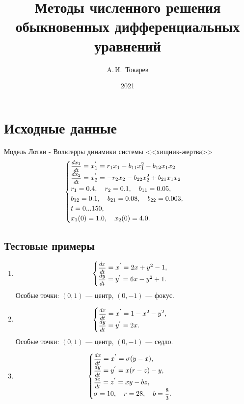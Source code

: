\documentclass[12pt, a4paper]{article}
\title{Методы численного решения обыкновенных дифференциальных уравнений}
\author{A.\,И.~Токарев}
\date{2021}
\begin{document}
\maketitle
\tableofcontents 
\newpage

\section{Исходные данные}
Модель Лотки - Вольтерры динамики системы <<хищник-жертва>>
\begin{equation*}
\begin{cases}
\hbox{\footnotesize$\displaystyle\frac{dx_1}{dt}$}= x_1^{'} =r_1x_1 - b_{11}x_1^2-b_{12}x_1x_2\\
\hbox{\footnotesize$\displaystyle\frac{dx_2}{dt}$}= x_2^{'} =-r_2x_2-b_{22}x_2^2+b_{21}x_1x_2\\
r_1 = 0{.}4, \quad r_2 = 0{.}1, \quad b_{11} = 0{.}05,\\
b_{12} = 0{.}1,\quad b_{21} = 0{.}08,\quad b_{22} = 0{.}003,\\
t = 0...150,\\
x_1(0) = 1{.}0,\quad x_2(0) = 4{.}0.
\end{cases}
\end{equation*}

\subsection{Тестовые примеры}
\begin{enumerate}
	\item\begin{equation*}
	\begin{cases}
	\hbox{\footnotesize$\displaystyle\frac{dx}{dt}$}= x^{'} =2x + y^2 - 1,\\
	\hbox{\footnotesize$\displaystyle\frac{dy}{dt}$}= y^{'} =6x - y^2 + 1.\\
	\end{cases}
	\end{equation*}
	Особые точки: $(0, 1)$ --- центр, $(0, -1)$ --- фокус.
	\item\begin{equation*}
	\begin{cases}
	\hbox{\footnotesize$\displaystyle\frac{dx}{dt}$}= x^{'} =1 - x^2 - y^2,\\
	\hbox{\footnotesize$\displaystyle\frac{dy}{dt}$}= y^{'} =2x.\\
	\end{cases}
	\end{equation*}
	Особые точки: $(0, 1)$ --- центр, $(0, -1)$ --- седло.
	\item\begin{equation*}
	\begin{cases}
	\hbox{\footnotesize$\displaystyle\frac{dx}{dt}$}= x^{'} =\sigma(y - x),\\
	\hbox{\footnotesize$\displaystyle\frac{dy}{dt}$}= y^{'} =x(r - z) - y,\\
	\hbox{\footnotesize$\displaystyle\frac{dz}{dt}$}= z^{'} =xy - bz,\\
	\sigma = 10, \quad r = 28, \quad b = \hbox{\footnotesize$\displaystyle\frac{8}{3}$}.
	\end{cases}
	\end{equation*}
\end{enumerate}
\end{document}
